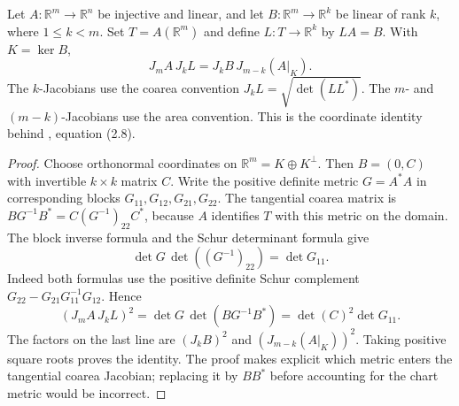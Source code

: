 \begin{lemma}\label{lem:coarea-chart-jacobian-identity}
Let $A:\mathbb R^m\to\mathbb R^n$ be injective and linear, and let $B:\mathbb R^m\to\mathbb R^k$ be linear of rank $k$, where $1\leq k<m$. Set $T=A(\mathbb R^m)$ and define $L:T\to\mathbb R^k$ by $LA=B$. With $K=\ker B$,
\[
 J_mA\,J_kL=J_kB\,J_{m-k}(A|_K).
\]
The $k$-Jacobians use the coarea convention $J_kL=\sqrt{\det(LL^*)}$. The $m$- and $(m-k)$-Jacobians use the area convention. This is the coordinate identity behind \cite{Sim18}, equation (2.8).
\end{lemma}
\begin{proof}
Choose orthonormal coordinates on $\mathbb R^m=K\oplus K^\perp$. Then $B=(0,C)$ with invertible $k\times k$ matrix $C$. Write the positive definite metric $G=A^*A$ in corresponding blocks $G_{11},G_{12},G_{21},G_{22}$. The tangential coarea matrix is $BG^{-1}B^*=C(G^{-1})_{22}C^*$, because $A$ identifies $T$ with this metric on the domain. The block inverse formula and the Schur determinant formula give
\[
 \det G\,\det((G^{-1})_{22})=\det G_{11}.
\]
Indeed both formulas use the positive definite Schur complement $G_{22}-G_{21}G_{11}^{-1}G_{12}$. Hence
\[
 (J_mA\,J_kL)^2
 =\det G\,\det(BG^{-1}B^*)
 =\det(C)^2\det G_{11}.
\]
The factors on the last line are $(J_kB)^2$ and $(J_{m-k}(A|_K))^2$. Taking positive square roots proves the identity. The proof makes explicit which metric enters the tangential coarea Jacobian; replacing it by $BB^*$ before accounting for the chart metric would be incorrect.
\end{proof}

